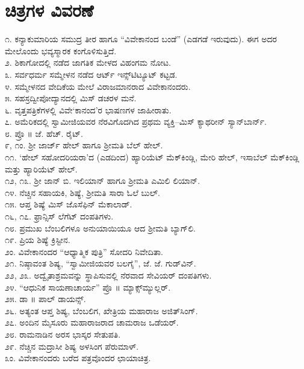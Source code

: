 
\chapter{ಚಿತ್ರಗಳ ವಿವರಣೆ}

೧. ಕನ್ಯಾಕುಮಾರಿಯ ಸಮುದ್ರ ತೀರ ಹಾಗೂ “ವಿವೇಕಾನಂದ ಬಂಡೆ” (ಎಡಗಡೆ ಇರುವುದು). ಈಗ ಅದರ ಮೇಲೊಂದು ಭವ್ಯಸ್ಮಾರಕ ಕಂಗೊಳಿಸುತ್ತಿದೆ.\\
೨. ಶಿಕಾಗೋದಲ್ಲಿ ನಡೆದ ಜಾಗತಿಕ ಮೇಳದ ವಿಹಂಗಮ ನೋಟ.\\
೩. ಸರ್ವಧರ್ಮ ಸಮ್ಮೇಳನ ನಡೆದ ಆರ್ಟ್ ಇನ್ಸ್​ಟಿಟ್ಯೂಟ್ ಕಟ್ಟಡ.\\
೪. ಸಮ್ಮೇಳನದ ವೇದಿಕೆಯ ಮೇಲೆ ವಿರಾಜಮಾನರಾದ ವಿವೇಕಾನಂದರು.\\
೫. ಸಹಸ್ರದ್ವೀಪೋದ್ಯಾನದಲ್ಲಿ ಮಿಸ್ ಡಚರಳ ಮನೆ.\\
೬. ವೃತ್ತಪತ್ರಿಕೆಗಳಲ್ಲಿ ವಿವೇ‘ಕಾನಂದ’ರ ಭಾಷಣಗಳ ಜಾಹೀರಾತು.\\
೭. ಅಮೆರಿಕದಲ್ಲಿ ಸ್ವಾಮೀಜಿಯವರ ನೆರವಿಗೊದಗಿದ ಪ್ರಥಮ ವ್ಯಕ್ತಿ–ಮಿಸ್ ಕ್ಯಾಥರೀನ್ ಸ್ಯಾನ್​ಬಾರ್ನ್.\\
೮. ಪ್ರೊ ॥ ಜೆ. ಹೆಚ್. ರೈಟ್.\\
೯, ೧ಂ. ಶ್ರೀ ಜಾರ್ಜ್ ಹೇಲ್ ಹಾಗೂ ಶ್ರೀಮತಿ ಬೆಲ್ ಹೇಲ್.\\
೧೧. ‘ಹೇಲ್ ಸಹೋದರಿಯರಾ’ದ (ಎಡದಿಂದ) ಹ್ಯಾರಿಯೆಟ್ ಮೆಕ್​ಕಿಂಡ್ಲಿ, ಮೇರಿ ಹೇಲ್, ಇಸಾಬೆಲ್ ಮೆಕ್​ಕಿಂಡ್ಲಿ ಮತ್ತು ಹ್ಯಾರಿಯೆಟ್ ಹೇಲ್.\\
೧೨, ೧೩. ಶ್ರೀ ಜಾನ್ ಬಿ. ಇಲಿಯಾನ್ ಹಾಗೂ ಶ್ರೀಮತಿ ಎಮಿಲಿ ಲಿಯಾನ್.\\
೧೪. ನೆಚ್ಚಿನ ಸಹಾಯಕಿ, ಶಿಷ್ಯೆ, ಶ್ರೀಮತಿ ಸಾರಾ ಓಲೆ ಬುಲ್.\\
೧೫. ಆಪ್ತ ಶಿಷ್ಯೆ ಮಿಸ್ ಜೊಸೆಫಿನ್ ಮೆಕಾಲಾಡ್.\\
೧೬, ೧೭. ಫ್ರಾನ್ಸಿಸ್ ಲೆಗೆಟ್ ದಂಪತಿಗಳು.\\
೧೮. ಪ್ರಮುಖ ಬೆಂಬಲಿಗಳೂ ಅನುಯಾಯಿಯೂ ಆದ ಶ್ರೀಮತಿ ಬ್ಯಾಗ್​ಲಿ.\\
೧೯. ಪ್ರಿಯ ಶಿಷ್ಯೆ ಕ್ರಿಸ್ಟೀನ.\\
೨ಂ. ವಿವೇಕಾನಂದರ “ಆಧ್ಯಾತ್ಮಿಕ ಪುತ್ರಿ” ಸೋದರಿ ನಿವೇದಿತಾ.\\
೨೧. ನಿಷ್ಠಾವಂತ ಶಿಷ್ಯ, “ಸ್ವಾಮೀಜಿಯವರ ಬಲಗೈ”, ಜೆ. ಜೆ. ಗುಡ್​ವಿನ್.\\
೨೨, ೨೩. ಅದ್ವೈತಾಶ್ರಮವನ್ನು ಸ್ಥಾಪಿಸುವಲ್ಲಿ ನೆರವಾದ ಸೇವಿಯರ್ ದಂಪತಿಗಳು.\\
೨೪. “ಆಧುನಿಕ ಸಾಯಣಾಚಾರ್ಯ” ಪ್ರೊ ॥ ಮ್ಯಾಕ್ಸ್​ಮ್ಯುಲ್ಲರ್.\\
೨೫. ಡಾ ॥ ಪಾಲ್ ಡಾಯನ್ಸ್.\\
೨೬. ಅತ್ಯಂತ ಆಪ್ತ ಶಿಷ್ಯ, ಬೆಂಬಲಿಗ, ಖೇತ್ರಿಯ ಮಹಾರಾಜ ಅಜಿತ್​ಸಿಂಗ್.\\
೨೭. ಅಂದಿನ ಮೈಸೂರು ಮಹಾರಾಜರಾದ ಚಾಮರಾಜ ಒಡೆಯರ್.\\
೨೮. ರಾಮನಾಡಿನ ಅರಸ ಭಾಸ್ಕರ ಸೇತುಪತಿ.\\
೨೯. ನೆಚ್ಚಿನ ಮದ್ರಾಸೀ ಶಿಷ್ಯ ಅಳಸಿಂಗ ಪೆರುಮಾಳ್.\\
೩ಂ. ವಿವೇಕಾನಂದರು ಬರೆದ ಪತ್ರವೊಂದರ ಛಾಯಾಚಿತ್ರ.

